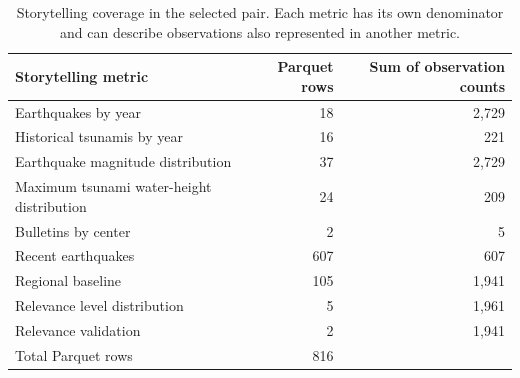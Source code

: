 \documentclass[a4paper,11pt,oneside]{book}
\begin{document}
\begin{table}[htbp]
\centering
\small
\begin{tabularx}{\textwidth}{@{}Yrr@{}}
\toprule
Storytelling metric & Parquet rows & Sum of observation counts \\
\midrule
Earthquakes by year & 18 & 2,729 \\
Historical tsunamis by year & 16 & 221 \\
Earthquake magnitude distribution & 37 & 2,729 \\
Maximum tsunami water-height distribution & 24 & 209 \\
Bulletins by center & 2 & 5 \\
\midrule
Recent earthquakes & 607 & 607 \\
Regional baseline & 105 & 1,941 \\
Relevance level distribution & 5 & 1,961 \\
Relevance validation & 2 & 1,941 \\
\midrule
Total Parquet rows & 816 & \\
\bottomrule
\end{tabularx}
\caption{Storytelling coverage in the selected pair. Each metric has its own denominator and can describe observations also represented in another metric.}
\label{tab:story-counts}
\end{table}
\end{document}
